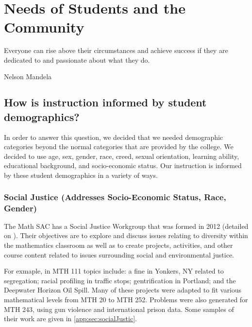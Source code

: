 \chapter{Needs of Students and the Community}
\epigraph{Everyone can rise above their circumstances and achieve success if they are dedicated to and passionate about what they do.}{Nelson Mandela}

\section{How is instruction informed by student demographics?}
In order to answer this question, we decided that we needed demographic
categories beyond the normal categories that are provided by the college. We
decided to use age, sex, gender, race, creed, sexual orientation, learning
ability, educational background, and socio-economic status. Our instruction is
informed by these student demographics in a variety of ways.
\label{needs:sec:definitiondiversity}



\subsection{Social Justice (Addresses Socio-Economic Status, Race, Gender)}
The Math SAC has a Social Justice Workgroup that was formed in 2012 (detailed 
on ).  Their
objectives are to explore and discuss issues relating to diversity within the
mathematics classroom as well as to create projects, activities, and other
course content related to issues surrounding social and environmental justice.

For exmaple, in MTH 111 topics include: a fine in Yonkers, NY related
to segregation; racial profiling in traffic stops; gentrification
in Portland; and the Deepwater Horizon Oil Spill. Many of these projects were
adapted to fit various mathematical levels from MTH 20 to MTH 252. Problems
were also generated for MTH 243, using gun violence and international prison
data. Some samples of their work are given in \vref{app:sec:socialJustic}.

